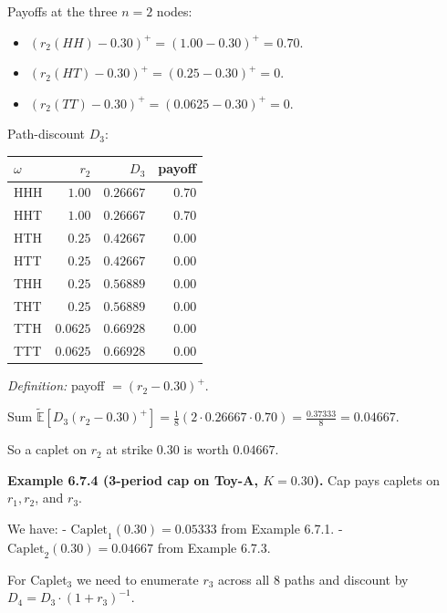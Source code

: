 \documentclass[
  10pt,
  twoside]{book}
\newcounter{none} %
\providecommand{\tightlist}{%
  \setlength{\itemsep}{0pt}\setlength{\parskip}{0pt}}
\begin{document}
Payoffs at the three \(n=2\) nodes:

\begin{itemize}
\tightlist
\item
  \((r_2(HH) - 0.30)^+ = (1.00 - 0.30)^+ = 0.70\).
\item
  \((r_2(HT) - 0.30)^+ = (0.25 - 0.30)^+ = 0\).
\item
  \((r_2(TT) - 0.30)^+ = (0.0625 - 0.30)^+ = 0\).
\end{itemize}

Path-discount \(D_3\):

{\def\LTcaptype{none} %
\begin{table}[H]
\centering
\begin{tabular}{|l|r|r|r|}
\toprule
\(\omega\) & \(r_2\) & \(D_3\) & payoff \\
\midrule



HHH & \(1.00\) & \(0.26667\) & \(0.70\) \\
HHT & \(1.00\) & \(0.26667\) & \(0.70\) \\
HTH & \(0.25\) & \(0.42667\) & \(0.00\) \\
HTT & \(0.25\) & \(0.42667\) & \(0.00\) \\
THH & \(0.25\) & \(0.56889\) & \(0.00\) \\
THT & \(0.25\) & \(0.56889\) & \(0.00\) \\
TTH & \(0.0625\) & \(0.66928\) & \(0.00\) \\
TTT & \(0.0625\) & \(0.66928\) & \(0.00\) \\
\bottomrule
\end{tabular}
\end{table}
}

\emph{Definition:} payoff \(= (r_2 - 0.30)^+\).

Sum
\(\tilde{\mathbb E}[D_3 (r_2 - 0.30)^+] = \tfrac{1}{8}(2 \cdot 0.26667 \cdot 0.70) = \tfrac{0.37333}{8} = 0.04667.\)

So a caplet on \(r_2\) at strike \(0.30\) is worth \(0.04667\).

\textbf{Example 6.7.4 (3-period cap on Toy-A, \(K = 0.30\)).} Cap pays
caplets on \(r_1, r_2\), and \(r_3\).

We have: - \(\text{Caplet}_1(0.30) = 0.05333\) from Example 6.7.1. -
\(\text{Caplet}_2(0.30) = 0.04667\) from Example 6.7.3.

For Caplet\(_3\) we need to enumerate \(r_3\) across all 8 paths and
discount by \(D_4 = D_3 \cdot (1 + r_3)^{-1}\).
\end{document}

